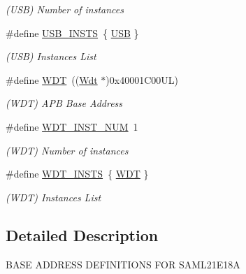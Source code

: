 \begin{DoxyCompactItemize}
\begin{DoxyCompactList}\small\item\em (U\+S\+B) Number of instances \end{DoxyCompactList}\item 
\hypertarget{group___s_a_m_l21_e18_a__base_gae914fabf48ea56af34ccce34ab95a6c0}{}\#define \hyperlink{group___s_a_m_l21_e18_a__base_gae914fabf48ea56af34ccce34ab95a6c0}{U\+S\+B\+\_\+\+I\+N\+S\+T\+S}~\{ \hyperlink{group___s_a_m_l21_j18_a__base_ga779bf099075a999d1074357fccbd466b}{U\+S\+B} \}\label{group___s_a_m_l21_e18_a__base_gae914fabf48ea56af34ccce34ab95a6c0}

\begin{DoxyCompactList}\small\item\em (U\+S\+B) Instances List \end{DoxyCompactList}\item 
\hypertarget{group___s_a_m_l21_e18_a__base_ga9646f603341e1ee220bf5d9948f05cb0}{}\#define \hyperlink{group___s_a_m_l21_e18_a__base_ga9646f603341e1ee220bf5d9948f05cb0}{W\+D\+T}~((\hyperlink{struct_wdt}{Wdt}      $\ast$)0x40001\+C00\+U\+L)\label{group___s_a_m_l21_e18_a__base_ga9646f603341e1ee220bf5d9948f05cb0}

\begin{DoxyCompactList}\small\item\em (W\+D\+T) A\+P\+B Base Address \end{DoxyCompactList}\item 
\hypertarget{group___s_a_m_l21_e18_a__base_gafac1297a6a4da34e5ff29b61dfb5552e}{}\#define \hyperlink{group___s_a_m_l21_e18_a__base_gafac1297a6a4da34e5ff29b61dfb5552e}{W\+D\+T\+\_\+\+I\+N\+S\+T\+\_\+\+N\+U\+M}~1\label{group___s_a_m_l21_e18_a__base_gafac1297a6a4da34e5ff29b61dfb5552e}

\begin{DoxyCompactList}\small\item\em (W\+D\+T) Number of instances \end{DoxyCompactList}\item 
\hypertarget{group___s_a_m_l21_e18_a__base_gacde2ac91a26c9c096b18f47009b48b81}{}\#define \hyperlink{group___s_a_m_l21_e18_a__base_gacde2ac91a26c9c096b18f47009b48b81}{W\+D\+T\+\_\+\+I\+N\+S\+T\+S}~\{ \hyperlink{group___s_a_m_l21_j18_a__base_ga9646f603341e1ee220bf5d9948f05cb0}{W\+D\+T} \}\label{group___s_a_m_l21_e18_a__base_gacde2ac91a26c9c096b18f47009b48b81}

\begin{DoxyCompactList}\small\item\em (W\+D\+T) Instances List \end{DoxyCompactList}\end{DoxyCompactItemize}


\subsection{Detailed Description}
B\+A\+S\+E A\+D\+D\+R\+E\+S\+S D\+E\+F\+I\+N\+I\+T\+I\+O\+N\+S F\+O\+R S\+A\+M\+L21\+E18\+A 